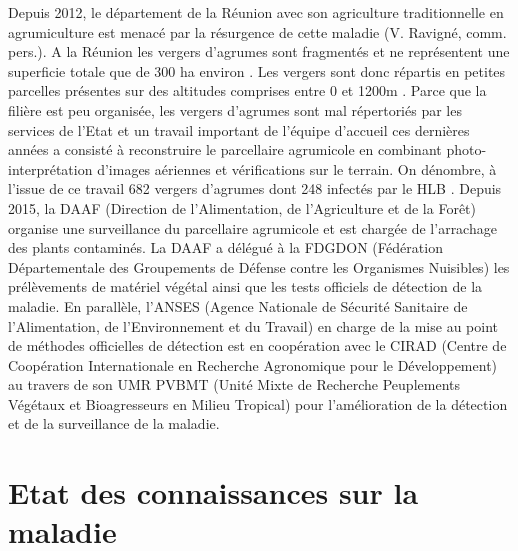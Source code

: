 \documentclass[
  11pt,
  french,
  a4paper,
  extrafontsizes,onecolumn,openright
  ]{memoir}
\begin{document}
Depuis 2012, le département de la Réunion avec son agriculture traditionnelle en agrumiculture est menacé par la résurgence de cette maladie (V. Ravigné, comm. pers.). A la Réunion les vergers d'agrumes sont fragmentés et ne représentent une superficie totale que de 300 ha environ \autocite{leung_production_2014}. Les vergers sont donc répartis en petites parcelles présentes sur des altitudes comprises entre 0 et 1200m \autocite{guilloteau_utilisation_2018}. Parce que la filière est peu organisée, les vergers d'agrumes sont mal répertoriés par les services de l'Etat et un travail important de l'équipe d'accueil ces dernières années a consisté à reconstruire le parcellaire agrumicole en combinant photo-interprétation d'images aériennes et vérifications sur le terrain. On dénombre, à l'issue de ce travail 682 vergers d'agrumes dont 248 infectés par le HLB \autocite{guilloteau_utilisation_2018}.
Depuis 2015, la DAAF (Direction de l'Alimentation, de l'Agriculture et de la Forêt) organise une surveillance du parcellaire agrumicole et est chargée de l'arrachage des plants contaminés. La DAAF a délégué à la FDGDON (Fédération Départementale des Groupements de Défense contre les Organismes Nuisibles) les prélèvements de matériel végétal ainsi que les tests officiels de détection de la maladie. En parallèle, l'ANSES (Agence Nationale de Sécurité Sanitaire de l'Alimentation, de l'Environnement et du Travail) en charge de la mise au point de méthodes officielles de détection est en coopération avec le CIRAD (Centre de Coopération Internationale en Recherche Agronomique pour le Développement) au travers de son UMR PVBMT (Unité Mixte de Recherche Peuplements Végétaux et Bioagresseurs en Milieu Tropical) pour l'amélioration de la détection et de la surveillance de la maladie.

\vfill
\newpage

\hypertarget{etat-des-connaissances-sur-la-maladie}{%
\section{Etat des connaissances sur la maladie}\label{etat-des-connaissances-sur-la-maladie}}
\end{document}
